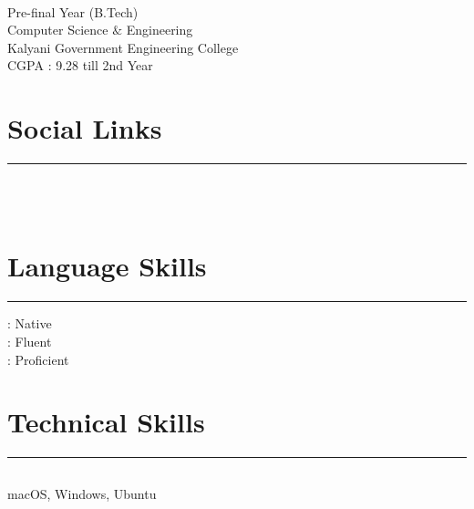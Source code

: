 \documentclass[]{debjitpal-resume}
\begin{document}
%
%

\begin{minipage}[t]{0.35\textwidth} 
\begin{large}
	\\
\end{large}
Pre-final Year (B.Tech)\\
Computer Science $\&$  Engineering\\ 
Kalyani Government Engineering College \\ 
CGPA : 9.28 till 2nd Year 
\section{Social Links} 
\noindent\rule{5cm}{0.4pt}

\href{https://github.com/debjitpal5040}{} \href{https://www.linkedin.com/in/debjit-pal-539214192/}{} \href{https://www.twitter.com/debjitpal5040}{} \\
\href{https://www.codechef.com/users/debjitpal5040}{} \href{https://www.hackerrank.com/debjitpal5040}{} \href{https://codeforces.com/profile/a_beautiful_mind}{} \\
\href{https://developers.google.com/profile/u/debjitpal}{}
\section{Language Skills}
\noindent\rule{5cm}{0.4pt}

 : Native\\
  : Fluent\\
  : Proficient
\section{Technical Skills}
\noindent\rule{5cm}{0.4pt}
\subsection{}
macOS, Windows, Ubuntu
\vspace{6pt}

\end{minipage}
\end{document}
